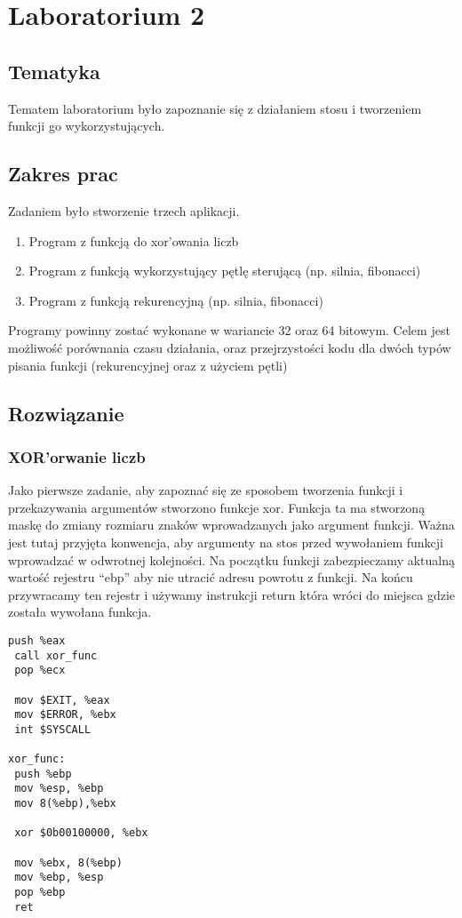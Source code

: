 \chapter{Laboratorium 2}
\section{Tematyka}
Tematem laboratorium było zapoznanie się z działaniem stosu i tworzeniem funkcji
go wykorzystujących.
\section{Zakres prac}
Zadaniem było stworzenie trzech aplikacji.
\begin{enumerate}
	\item Program z funkcją do xor'owania liczb
	\item Program z funkcją wykorzystujący pętlę sterującą (np. silnia, fibonacci)
	\item Program z funkcją rekurencyjną (np. silnia, fibonacci)
\end{enumerate}
Programy powinny zostać wykonane w wariancie 32 oraz 64 bitowym. Celem jest możliwość porównania czasu działania, oraz przejrzystości kodu dla dwóch typów pisania funkcji (rekurencyjnej oraz z użyciem pętli)

\section{Rozwiązanie}
\subsection{XOR'orwanie liczb}
Jako pierwsze zadanie, aby zapoznać się ze sposobem tworzenia funkcji i przekazywania argumentów stworzono funkcje xor. Funkcja ta ma stworzoną maskę do zmiany rozmiaru znaków wprowadzanych jako argument funkcji. Ważna jest tutaj przyjęta konwencja, aby argumenty na stos przed wywołaniem funkcji wprowadzać w odwrotnej kolejności. Na początku funkcji zabezpieczamy aktualną wartość rejestru "`ebp"' aby nie utracić adresu powrotu z funkcji. Na końcu przywracamy ten rejestr i używamy instrukcji return która wróci do miejsca gdzie została wywołana funkcja.
\begin{lstlisting}[frame=single, basicstyle=\small, caption=Funkcja XORująca]
 push %eax
 call xor_func
 pop %ecx

 mov $EXIT, %eax
 mov $ERROR, %ebx
 int $SYSCALL

xor_func:
 push %ebp
 mov %esp, %ebp
 mov 8(%ebp),%ebx
 
 xor $0b00100000, %ebx

 mov %ebx, 8(%ebp)
 mov %ebp, %esp
 pop %ebp
 ret
\end{lstlisting}

